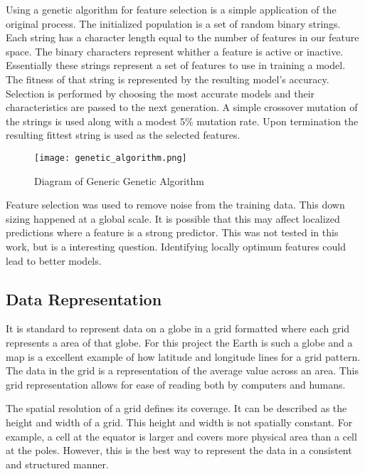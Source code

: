 \par
Using a genetic algorithm for feature selection is a simple application of the original process.
The initialized population is a set of random binary strings.
Each string has a character length equal to the number of features in our feature space.
The binary characters represent whither a feature is active or inactive.
Essentially these strings represent a set of features to use in training a model.
The fitness of that string is represented by the resulting model's accuracy.
Selection is performed by choosing the most accurate models and their characteristics are passed to the next generation.
A simple crossover mutation of the strings is used along with a modest 5\% mutation rate.
Upon termination the resulting fittest string is used as the selected features.


\begin{figure}[h]
    \centering
    \caption{Diagram of Generic Genetic Algorithm}
    \label{fig:GA}
    \texttt{[image: genetic\_algorithm.png]}
\end{figure}

\par
Feature selection was used to remove noise from the training data.
This down sizing happened at a global scale.
It is possible that this may affect localized predictions where a feature is a strong predictor.
This was not tested in this work, but is a interesting question.
Identifying locally optimum features could lead to better models.


\subsection{Data Representation}
It is standard to represent data on a globe in a grid formatted where each grid represents a area of that globe.
For this project the Earth is such a globe and a map is a excellent example of how latitude and longitude lines for a grid pattern.
The data in the grid is a representation of the average value across an area.
This grid representation allows for ease of reading both by computers and humans.

\par
The spatial resolution of a grid defines its coverage.
It can be described as the height and width of a grid.
This height and width is not spatially constant.
For example, a cell at the equator is larger and covers more physical area than a cell at the poles.
However, this is the best way to represent the data in a consistent and structured manner.

